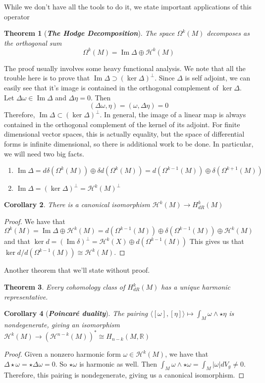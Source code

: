 \documentclass[psamsfonts]{amsart}
\newtheorem{thm}{Theorem}[section]
\newtheorem{cor}[thm]{Corollary}
\theoremstyle{definition}
\theoremstyle{remark}
\newcommand{\R}{\mathbb{R}}
\newcommand{\ib}[1]{\textbf{\textit{#1}}}
\DeclareMathOperator{\im}{Im}
\begin{document}
While we don't have all the tools to do it, we state important applications of this operator
\begin{thm}[\ib{The Hodge Decomposition}]
The space $\Omega^k(M)$ decomposes as the orthogonal sum
$$\Omega^k(M) = \im \Delta \oplus \mathcal{H}^k(M) $$
\end{thm}
The proof usually involves some heavy functional analysis. We note that all the trouble here is to prove that $\im \Delta \supset (\ker\Delta)^\perp$. Since $\Delta$ is self adjoint, we can easily see that it's image is contained in the orthogonal complement of $\ker \Delta$. Let $\Delta \omega \in \im \Delta$ and $\Delta \eta = 0$. Then
$$(\Delta\omega, \eta) = (\omega,\Delta\eta) = 0 $$
Therefore, $\im\Delta \subset (\ker\Delta)^\perp$. In general, the image of a linear map is always contained in the orthogonal complement of the kernel of its adjoint. For finite dimensional vector spaces, this is actually equality, but the space of differential forms is infinite dimensional, so there is additional work to be done. In particular, we will need two big facts.
\begin{enumerate}
\item $\im \Delta = d\delta(\Omega^k(M)) \oplus \delta d(\Omega^k(M)) = d(\Omega^{k-1}(M)) \oplus \delta(\Omega^{k+1}(M))$
\item $\im \Delta = (\ker\Delta)^\perp = \mathcal{H}^k(M)^\perp$
\end{enumerate} 
\begin{cor}
There is a canonical isomorphism $\mathcal{H}^k(M) \to H^k_{dR}(M)$
\end{cor}
\begin{proof}
We have that 
$$\Omega^k(M) = \im\Delta \oplus \mathcal{H}^k(M) = d(\Omega^{k-1}(M)) \oplus \delta(\Omega^{k-1}(M)) \oplus \mathcal{H}^k(M)$$
and that $\ker d = (\im \delta)^\perp = \mathcal{H}^k(X) \oplus d(\Omega^{k-1}(M))$ This gives us that $\ker d / d(\Omega^{k-1}(M)) \cong \mathcal{H}^k(M)$.
\end{proof}
Another theorem that we'll state without proof.
\begin{thm}
Every cohomology class of $H^k_{dR}(M)$ has a unique harmonic representative.
\end{thm}
\begin{cor}[\ib{Poincar\'e duality}]
The pairing $\langle [\omega], [\eta]\rangle \mapsto \int_M \omega \wedge \star\eta$ is nondegenerate, giving an isomorphism $\mathcal{H}^k(M)\to(\mathcal{H}^{n-k}(M))^* \cong H_{n-k}(M, \R)$
\end{cor}
\begin{proof}
Given a nonzero harmonic form $\omega \in \mathcal{H}^k(M)$, we have that $\Delta\star\omega = \star\Delta\omega = 0$. So $\star\omega$ is harmonic as well. Then $\int_M \omega\wedge\star\omega = \int_M|\omega|dV_g \neq 0$. Therefore, this pairing is nondegenerate, giving us a canonical isomorphism.
\end{proof}
%
\end{document}
